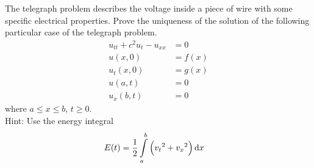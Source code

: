 \documentclass[titlepage, fleqn, a4paper, 12pt, twoside]{article}
\theoremstyle{definition}
\theoremstyle{theorem}
\begin{document}
\begin{question}
	The telegraph problem describes the voltage inside a piece of wire with some specific electrical properties.
	Prove the uniqueness of the solution of the following particular case of the telegraph problem.
	\begin{align*}
		u_{t t} + c^2 u_t - u_{x x} & = 0    \\
		u(x,0)                      & = f(x) \\
		u_t(x,0)                    & = g(x) \\
		u(a,t)                      & = 0    \\
		u_x(b,t)                    & = 0
	\end{align*}
	where $a \le x \le b$, $t \ge 0$.\\
	Hint: Use the energy integral
	\begin{align*}
		E(t) & = \frac{1}{2} \int\limits_{a}^{b} \left( {v_t}^2 + {v_x}^2 \right) \dif x
	\end{align*}
\end{question}
\end{document}
